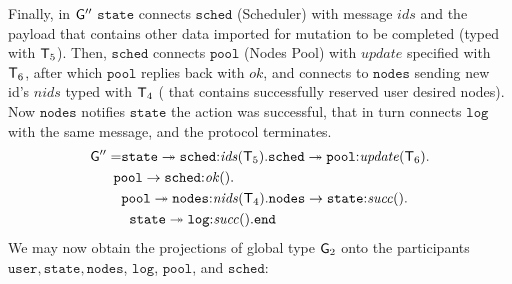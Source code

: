 Finally, in ${\sf G}''$ $\mathtt{state}$ connects $\mathtt{sched}$ (Scheduler) with message $\mathit{ids}$ and the payload that contains other data imported for mutation to be completed (typed with ${\mathsf T}_5$). 
Then, $\mathtt{sched}$ connects $\mathtt{pool}$ (Nodes Pool) with $\mathit{update}$ specified with ${\mathsf T}_6$, after which $\mathtt{pool}$ replies back with $\mathit{ok}$, and connects to $\mathtt{nodes}$ sending new id's $\mathit{nids}$ typed with ${\mathsf T}_4$ ( that contains successfully reserved user desired nodes). Now $\mathtt{nodes}$ notifies $\mathtt{state}$ the action was successful, that in turn connects $\mathtt{log}$ with the same message, and the protocol terminates.
\begin{align*}
\G'' = &
\mathtt{state}\twoheadrightarrow\mathtt{sched}{:}\mathit{ids}(\T_5).
\mathtt{sched}\twoheadrightarrow\mathtt{pool}{:}\mathit{update}(\T_6). \\
& \hspace{-2mm}
\mathtt{pool}\to\mathtt{sched}{:}\mathit{ok}(). \\
& %
\mathtt{pool}\twoheadrightarrow\mathtt{nodes}{:}\mathit{nids}(\T_4). 
\mathtt{nodes}\to\mathtt{state}{:}\mathit{succ}(). \\
& \hspace{2mm}
\mathtt{state}\twoheadrightarrow \mathtt{log}{:}\mathit{succ}().\tend
\end{align*}
We may now obtain the projections of global type ${\sf G}_2$ onto the participants $\mathtt{user}, \mathtt{state}, \mathtt{nodes}$, $\mathtt{log}$, $\mathtt{pool}$, and $\mathtt{sched}$:
